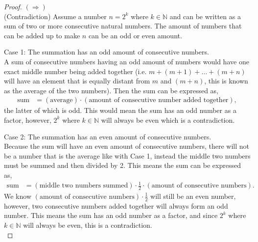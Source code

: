 \documentclass[11pt]{article}
\newcommand{\N}{\mathbb{N}}
\begin{document}
\begin{proof}
	$(\Longrightarrow)$\\
	(Contradiction) Assume a number $n=2^k$ where $k \in \N$ and can be written as a sum of two or more consecutive natural numbers. The amount of numbers that can be added up to make $n$ can be an odd or even amount.

	Case 1: The summation has an odd amount of consecutive numbers.\\
	A sum of consecutive numbers having an odd amount of numbers would have one exact middle number being added together (i.e. $m + (m+1) + \ldots + (m+n)$ will have an element that is equally distant from $m$ and $(m+n)$, this is known as the average of the two numbers). Then the sum can be expressed as,
	\begin{align*}
	 	\text{sum} &= (\text{average}) \cdot (\text{amount of consecutive number added together}),
	 \end{align*}
	the latter of which is odd. This would mean the sum has an odd number as a factor, however, $2^k$ where $k \in \N$ will always be even which is a contradiction.

	Case 2: The summation has an even amount of consecutive numbers.\\
	Because the sum will have an even amount of consecutive numbers, there will not be a number that is the average like with Case 1, instead the middle two numbers must be summed and then divided by 2. This means the sum can be expressed as,
	\begin{align*}
	 	\text{sum} &= (\text{middle two numbers summed}) \cdot \frac{1}{2} \cdot (\text{amount of consecutive numbers}).
 	\end{align*}
	We know $(\text{amount of consecutive numbers}) \cdot \frac{1}{2}$ will still be an even number, however, two consecutive numbers added together will always form an odd number. This means the sum has an odd number as a factor, and since $2^k$ where $k \in \N$ will always be even, this is a contradiction.\\


\end{proof}
\end{document}
